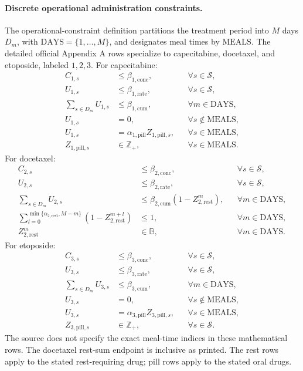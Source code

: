 \documentclass{article}
\begin{document}
\paragraph{Discrete operational administration constraints.}
The operational-constraint definition partitions the treatment period into $M$ days $D_m$, with $\mathrm{DAYS}=\{1,\ldots,M\}$, and designates meal times by $\mathrm{MEALS}$. The detailed official Appendix A rows specialize to capecitabine, docetaxel, and etoposide, labeled $1,2,3$. For capecitabine:
\begin{align*}
C_{1,s}&\leq\beta_{1,\mathrm{conc}}, &&\forall s\in\mathcal S,\\
U_{1,s}&\leq\beta_{1,\mathrm{rate}}, &&\forall s\in\mathcal S,\\
\sum_{s\in D_m}U_{1,s}&\leq\beta_{1,\mathrm{cum}}, &&\forall m\in\mathrm{DAYS},\\
U_{1,s}&=0, &&\forall s\notin\mathrm{MEALS},\\
U_{1,s}&=\alpha_{1,\mathrm{pill}}Z_{1,\mathrm{pill},s}, &&\forall s\in\mathrm{MEALS},\\
Z_{1,\mathrm{pill},s}&\in\mathbb Z_+, &&\forall s\in\mathrm{MEALS}.
\end{align*}
For docetaxel:
\begin{align*}
C_{2,s}&\leq\beta_{2,\mathrm{conc}}, &&\forall s\in\mathcal S,\\
U_{2,s}&\leq\beta_{2,\mathrm{rate}}, &&\forall s\in\mathcal S,\\
\sum_{s\in D_m}U_{2,s}&\leq\beta_{2,\mathrm{cum}}(1-Z_{2,\mathrm{rest}}^m), &&\forall m\in\mathrm{DAYS},\\
\sum_{l=0}^{\min\{\alpha_{2,\mathrm{rest}},M-m\}}(1-Z_{2,\mathrm{rest}}^{m+l})&\leq1, &&\forall m\in\mathrm{DAYS},\\
Z_{2,\mathrm{rest}}^m&\in\mathbb B, &&\forall m\in\mathrm{DAYS}.
\end{align*}
For etoposide:
\begin{align*}
C_{3,s}&\leq\beta_{3,\mathrm{conc}}, &&\forall s\in\mathcal S,\\
U_{3,s}&\leq\beta_{3,\mathrm{rate}}, &&\forall s\in\mathcal S,\\
\sum_{s\in D_m}U_{3,s}&\leq\beta_{3,\mathrm{cum}}, &&\forall m\in\mathrm{DAYS},\\
U_{3,s}&=0, &&\forall s\notin\mathrm{MEALS},\\
U_{3,s}&=\alpha_{3,\mathrm{pill}}Z_{3,\mathrm{pill},s}, &&\forall s\in\mathrm{MEALS},\\
Z_{3,\mathrm{pill},s}&\in\mathbb Z_+, &&\forall s\in\mathcal S.
\end{align*}
The source does not specify the exact meal-time indices in these mathematical rows. The docetaxel rest-sum endpoint is inclusive as printed. The rest rows apply to the stated rest-requiring drug; pill rows apply to the stated oral drugs.
\end{document}
